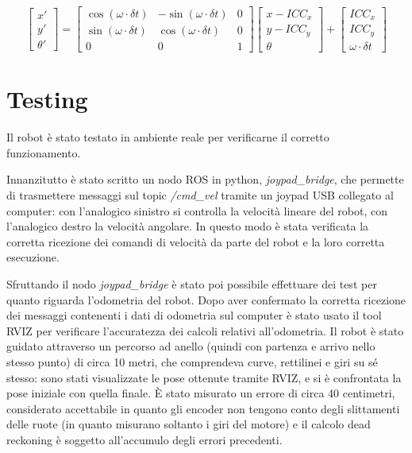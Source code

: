 \begin{displaymath}
    \begin{bmatrix} x' \\ y' \\ \theta'  \end{bmatrix}
    =
    \begin{bmatrix}
        \cos(\omega \cdot \delta t) & -\sin(\omega \cdot \delta t) & 0 \\
        \sin(\omega \cdot \delta t) & \cos(\omega \cdot \delta t) & 0 \\
        0 & 0 & 1
    \end{bmatrix}
    \begin{bmatrix}
        x - ICC_x \\
        y - ICC_y \\
        \theta
    \end{bmatrix}
    +
    \begin{bmatrix}
        ICC_x \\
        ICC_y \\
        \omega \cdot \delta t
   \end{bmatrix}
\end{displaymath}

\section{Testing}
Il robot è stato testato in ambiente reale per verificarne il corretto funzionamento.

Innanzitutto è stato scritto un nodo ROS in python, \textit{joypad\_bridge}, che permette di trasmettere messaggi sul topic \textit{/cmd\_vel} tramite un joypad USB collegato al computer: con l'analogico sinistro si controlla la velocità lineare del robot, con l'analogico destro la velocità angolare.
In questo modo è stata verificata la corretta ricezione dei comandi di velocità da parte del robot e la loro corretta esecuzione.

Sfruttando il nodo \textit{joypad\_bridge} è stato poi possibile effettuare dei test per quanto riguarda l'odometria del robot. Dopo aver confermato la corretta ricezione dei messaggi contenenti i dati di odometria sul computer è stato usato il tool RVIZ per verificare l'accuratezza dei calcoli relativi all'odometria. Il robot è stato guidato attraverso un percorso ad anello (quindi con partenza e arrivo nello stesso punto) di circa 10 metri, che comprendeva curve, rettilinei e giri su sé stesso: sono stati visualizzate le pose ottenute tramite RVIZ, e si è confrontata la pose iniziale con quella finale. È stato misurato un errore di circa 40 centimetri, considerato accettabile in quanto gli encoder non tengono conto degli slittamenti delle ruote (in quanto misurano soltanto i giri del motore) e il calcolo dead reckoning è soggetto all'accumulo degli errori precedenti.